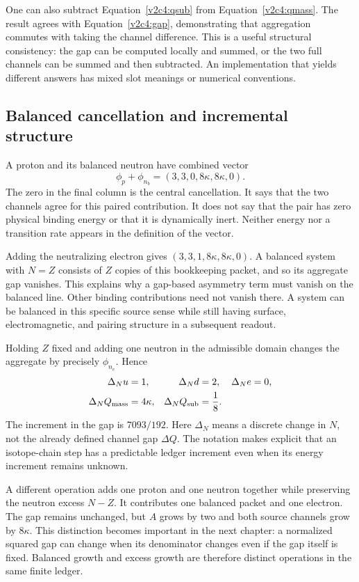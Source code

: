 One can also subtract Equation~\eqref{v2c4:qsub} from Equation~\eqref{v2c4:qmass}. The result agrees with Equation~\eqref{v2c4:gap}, demonstrating that aggregation commutes with taking the channel difference. This is a useful structural consistency: the gap can be computed locally and summed, or the two full channels can be summed and then subtracted. An implementation that yields different answers has mixed slot meanings or numerical conventions.

\subsection{Balanced cancellation and incremental structure}
\label{v2c4:balance}

A proton and its balanced neutron have combined vector
\begin{equation}
 \phi_p+\phi_{n_b}
 =(3,3,0,8\kappa,8\kappa,0).
 \label{v2c4:balancedpair}
\end{equation}
The zero in the final column is the central cancellation. It says that the two channels agree for this paired contribution. It does not say that the pair has zero physical binding energy or that it is dynamically inert. Neither energy nor a transition rate appears in the definition of the vector.

Adding the neutralizing electron gives $(3,3,1,8\kappa,8\kappa,0)$. A balanced system with $N=Z$ consists of $Z$ copies of this bookkeeping packet, and so its aggregate gap vanishes. This explains why a gap-based asymmetry term must vanish on the balanced line. Other binding contributions need not vanish there. A system can be balanced in this specific source sense while still having surface, electromagnetic, and pairing structure in a subsequent readout.

Holding $Z$ fixed and adding one neutron in the admissible domain changes the aggregate by precisely $\phi_{n_e}$. Hence
\begin{align}
 \Delta_N u&=1,& \Delta_N d&=2,& \Delta_N e&=0,\nonumber\\
 \Delta_N Q_{\rm mass}&=4\kappa,&
 \Delta_N Q_{\rm sub}&=\frac18.
 \label{v2c4:neutronstep}
\end{align}
The increment in the gap is $7093/192$. Here $\Delta_N$ means a discrete change in $N$, not the already defined channel gap $\Delta Q$. The notation makes explicit that an isotope-chain step has a predictable ledger increment even when its energy increment remains unknown.

A different operation adds one proton and one neutron together while preserving the neutron excess $N-Z$. It contributes one balanced packet and one electron. The gap remains unchanged, but $A$ grows by two and both source channels grow by $8\kappa$. This distinction becomes important in the next chapter: a normalized squared gap can change when its denominator changes even if the gap itself is fixed. Balanced growth and excess growth are therefore distinct operations in the same finite ledger.

